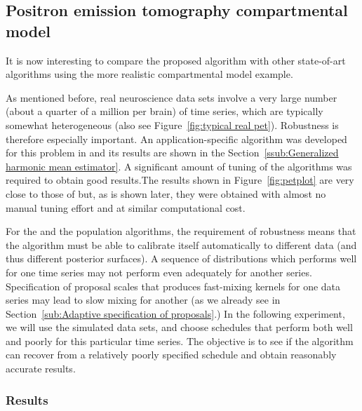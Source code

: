\subsection{Positron emission tomography compartmental model}
\label{sub:Positron emission tomography compartmental model}

It is now interesting to compare the proposed algorithm with other
state-of-art algorithms using the more realistic \pet compartmental model
example.

As mentioned before, real neuroscience data sets involve a very large number
(about a quarter of a million per brain) of time series, which are typically
somewhat heterogeneous (also see Figure~\ref{fig:typical real pet}).
Robustness is therefore especially important. An application-specific \mcmc
algorithm was developed for this problem in \cite{Zhou2013} and its results
are shown in the Section~\ref{ssub:Generalized harmonic mean estimator}. A
significant amount of tuning of the algorithms was required to obtain good
results.The results shown in Figure~\ref{fig:petplot} are very close to those
of \cite{Zhou2013} but, as is shown later, they were obtained with almost no
manual tuning effort and at similar computational cost.

For the \smc and the population \mcmc algorithms, the requirement of
robustness means that the algorithm must be able to calibrate itself
automatically to different data (and thus different posterior surfaces). A
sequence of distributions which performs well for one time series may not
perform even adequately for another series. Specification of proposal scales
that produces fast-mixing kernels for one data series may lead to slow mixing
for another (as we already see in Section~\ref{sub:Adaptive specification of
  proposals}.) In the following experiment, we will use the simulated data
sets, and choose schedules that perform both well and poorly for this
particular time series. The objective is to see if the algorithm can recover
from a relatively poorly specified schedule and obtain reasonably accurate
results.

\subsubsection{Results}

